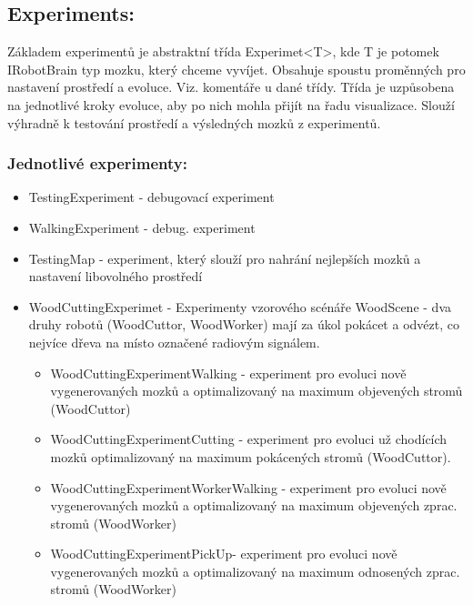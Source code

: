 \documentclass[12pt, oneside]{article}
\begin{document}
\subsection{Experiments:}
Základem experimentů je abstraktní třída Experimet<T>, kde T je potomek IRobotBrain typ mozku, který chceme vyvíjet. Obsahuje spoustu proměnných pro nastavení prostředí a evoluce. Viz. komentáře u dané třídy. Třída je uzpůsobena na jednotlivé kroky evoluce, aby po nich mohla přijít na řadu visualizace. Slouží výhradně k testování prostředí a výsledných mozků z experimentů. 
\subsubsection{Jednotlivé experimenty:}
\begin{itemize}
\item TestingExperiment - debugovací experiment
\item WalkingExperiment - debug. experiment
\item TestingMap - experiment, který slouží pro nahrání nejlepších mozků a nastavení libovolného prostředí
\item WoodCuttingExperimet - Experimenty vzorového scénáře WoodScene - dva druhy robotů (WoodCuttor, WoodWorker) mají za úkol pokácet a odvézt, co nejvíce dřeva na místo označené radiovým signálem.
\begin{itemize}
\item WoodCuttingExperimentWalking - experiment pro evoluci nově vygenerovaných mozků a optimalizovaný na maximum objevených stromů (WoodCuttor)
\item WoodCuttingExperimentCutting  - experiment pro  evoluci už chodících mozků optimalizovaný na maximum pokácených stromů (WoodCuttor). 
\item WoodCuttingExperimentWorkerWalking - experiment pro evoluci nově vygenerovaných mozků a optimalizovaný na maximum objevených zprac. stromů  (WoodWorker)
\item WoodCuttingExperimentPickUp- experiment pro evoluci nově vygenerovaných mozků a optimalizovaný na maximum  odnosených zprac. stromů (WoodWorker)
\end{itemize}
\end{itemize}
\newpage
\end{document}
